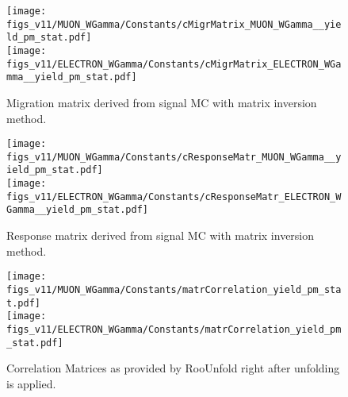 
\begin{figure}[htb]
  \begin{center}
   \texttt{[image: figs\_v11/MUON\_WGamma/Constants/cMigrMatrix\_MUON\_WGamma\_\_yield\_pm\_stat.pdf]}\\
\texttt{[image: figs\_v11/ELECTRON\_WGamma/Constants/cMigrMatrix\_ELECTRON\_WGamma\_\_yield\_pm\_stat.pdf]}
  \caption{Migration matrix derived from signal MC with matrix inversion method.}
  \label{fig:migrMatrices_Wg}
  \end{center}
\end{figure}

\begin{figure}[htb]
  \begin{center}
   \texttt{[image: figs\_v11/MUON\_WGamma/Constants/cResponseMatr\_MUON\_WGamma\_\_yield\_pm\_stat.pdf]}\\
\texttt{[image: figs\_v11/ELECTRON\_WGamma/Constants/cResponseMatr\_ELECTRON\_WGamma\_\_yield\_pm\_stat.pdf]}
  \caption{Response matrix derived from signal MC with matrix inversion method.}
  \label{fig:respMatrices_Wg}
  \end{center}
\end{figure}

\begin{figure}[htb]
  \begin{center}
   \texttt{[image: figs\_v11/MUON\_WGamma/Constants/matrCorrelation\_yield\_pm\_stat.pdf]}\\
\texttt{[image: figs\_v11/ELECTRON\_WGamma/Constants/matrCorrelation\_yield\_pm\_stat.pdf]}
  \caption{Correlation Matrices as provided by RooUnfold right after unfolding is applied.}
  \label{fig:corrMatrices_Wg}
  \end{center}
\end{figure}

